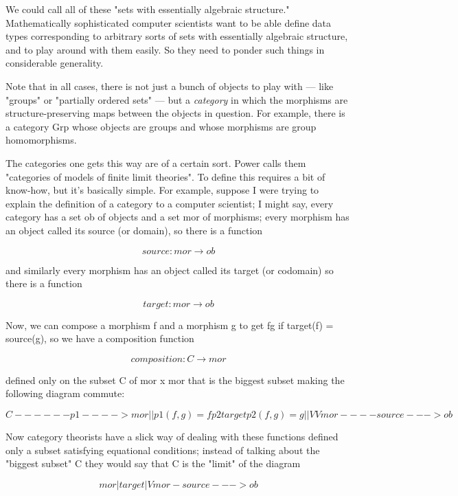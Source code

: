 We could call all of these "sets with essentially algebraic structure." 
Mathematically sophisticated computer scientists want to be able 
define data types corresponding to arbitrary sorts of sets with 
essentially algebraic structure, and to play around with them easily.  
So they need to ponder such things in considerable generality.

Note that in all cases, there is not just a bunch of objects to play with ---
like "groups" or "partially ordered sets" --- but a \emph{category} in which 
the morphisms are structure-preserving maps between the objects in question.  
For example, there is a category Grp whose objects are groups and whose 
morphisms are group homomorphisms.  

The categories one gets this way are of a certain sort.  Power calls 
them "categories of models of finite limit theories".  To define this 
requires a bit of know-how, but it's basically simple.  For example, suppose
I were trying to explain the definition of a category to a computer
scientist; I might say, every category has a set ob of objects
and a set mor of morphisms; every morphism has an object called
its source (or domain), so there is a function

$$
                  source: mor \to  ob
$$
    

and similarly every morphism has an object called its target
(or codomain) so there is a function

$$
                  target: mor \to  ob
$$
    

Now, we can compose a morphism f and a morphism g to get fg
if target(f) = source(g), so we have a composition function

$$
              composition: C \to  mor
$$
    

defined only on the subset C of mor x mor that is the biggest
subset making the following diagram commute:

$$
                   C  ------p1----> mor
                   |                 |             p1(f,g) = f
                  p2               target          p2(f,g) = g
                   |                 |
                   V                 V
                  mor ----source---> ob 
$$
    

Now category theorists have a slick way of dealing with these
functions defined only a subset satisfying equational conditions;
instead of talking about the "biggest subset" C they would say
that C is the "limit" of the diagram 

$$
                                 mor
                                  |
                               target
                                  |
                                  V
                  mor -source---> ob 
$$
    

